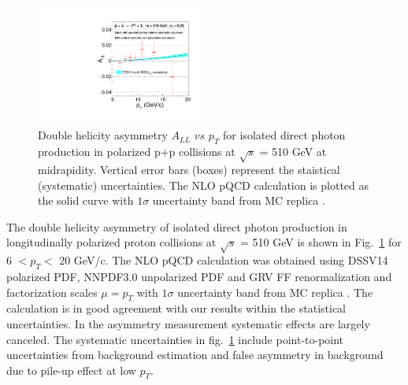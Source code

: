 \documentclass[twocolumn,letterpaper,aps,prl,longbibliography,superscriptaddress,floatfix]{revtex4-2}
\newcommand{\pT}{\ensuremath{p_T}}
\newcommand{\pizero}{\ensuremath{\pi^0}}
\newcommand{\ALL}{\ensuremath{A_{LL}}}
\begin{document}

\begin{figure}[htb]
\centering
\includegraphics[width=0.5\textwidth]{IsoPhotonALL-beam2}
\caption{Double helicity asymmetry $A_{LL}$ $vs$ $p_{T}$ for isolated direct photon production in polarized p+p collisions at $\sqrt{s}$ = 510 GeV at midrapidity. Vertical error bars (boxes) represent the staistical (systematic) uncertainties. The NLO pQCD calculation is plotted as the solid curve with $1\sigma$ uncertainty band from MC replica \cite{PhysRevLett.101.072001,PhysRevLett.113.012001,PhysRevD.100.114027}.}
\label{fig:all}
\end{figure}

The double helicity asymmetry of isolated direct photon production in longitudinally polarized proton collisions at $\sqrt{s}$ = 510 GeV is shown in Fig.~\ref{fig:all} for 6 $< p_{T} <$ 20 GeV/c. The NLO pQCD calculation was obtained using DSSV14 polarized PDF, NNPDF3.0 unpolarized PDF and GRV FF renormalization and factorization scales $\mu = p_T$ with $1\sigma$ uncertainty band from MC replica \cite{PhysRevLett.101.072001,PhysRevLett.113.012001,PhysRevD.100.114027}. The calculation is in good agreement with our results within the statistical uncertainties. In the asymmetry measurement systematic effects are largely canceled. The systematic uncertainties in fig.~\ref{fig:all} include point-to-point uncertainties from background estimation and false asymmetry in background due to pile-up effect at low \pT.
\end{document}
